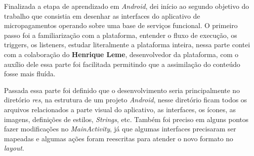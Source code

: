 \documentclass[hidelinks,12pt]{article}
\begin{document}
Finalizada a etapa de aprendizado em \textit{Android}, dei in\'icio ao segundo objetivo do trabalho que consistia em desenhar as interfaces do aplicativo de micropagamentos operando sobre uma base de servi\c{c}os funcional. O primeiro passo foi a familiariza\c{c}\~ao com a plataforma, entender o fluxo de execu\c{c}\~ao, os triggers, os listeners, estudar literalmente a plataforma inteira, nessa parte contei com a colabora\c{c}\~ao do \textbf{Henrique Leme}, desenvolvedor da plataforma, com o aux\'ilio dele essa parte foi facilitada permitindo que a assimila\c{c}\~ao do conteúdo fosse mais flu\'ida.

Passada essa parte foi definido que o desenvolvimento seria principalmente no diret\'orio \textit{res}, na estrutura de um projeto \textit{Android}, nesse diret\'orio ficam todos os arquivos relacionados a parte visual do aplicativo, as interfaces, os \'icones, as imagens, defini\c{c}\~oes de estilos, \textit{Strings}, etc. Tamb\'em foi preciso em alguns pontos fazer modifica\c{c}\~oes no \textit{MainActivity}, j\'a que algumas interfaces precisaram ser mapeadas e algumas a\c{c}\~oes foram reescritas para atender o novo formato no \textit{layout}.
\end{document}
